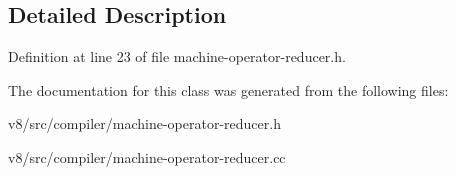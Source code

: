 \subsection{Detailed Description}


Definition at line 23 of file machine-\/operator-\/reducer.\+h.



The documentation for this class was generated from the following files\+:\begin{DoxyCompactItemize}
\item 
v8/src/compiler/machine-\/operator-\/reducer.\+h\item 
v8/src/compiler/machine-\/operator-\/reducer.\+cc\end{DoxyCompactItemize}
